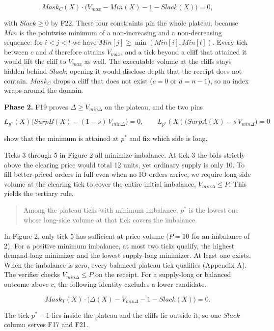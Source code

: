 \[Mask_C(X) \cdot \big(V_{max} - Min(X) - 1 - Slack(X)\big) = 0, \tag{F17}\]

with \(Slack \ge 0\) by F22. These four constraints pin the whole plateau, because \(Min\) is the pointwise minimum of a non-increasing and a non-decreasing sequence: for \(i < j < l\) we have \(Min[j] \ge \min(Min[i], Min[l])\). Every tick between \(c\) and \(d\) therefore attains \(V_{max}\), and a tick beyond a cliff that attained it would lift the cliff to \(V_{max}\) as well. The executable volume at the cliffs stays hidden behind \(Slack\); opening it would disclose depth that the receipt does not contain. \(Mask_C\) drops a cliff that does not exist (\(c = 0\) or \(d = n-1\)), so no index wraps around the domain.

\textbf{Phase 2.} F19 proves \(\Delta \ge V_{min\Delta}\) on the plateau, and the two pins

\[L_{p^*}(X)\big(SurpB(X) - (1-s)\,V_{min\Delta}\big) = 0, \qquad L_{p^*}(X)\big(SurpA(X) - s\,V_{min\Delta}\big) = 0 \tag{F20}\]

show that the minimum is attained at \(p^*\) and fix which side is long.

Ticks 3 through 5 in Figure 2 all minimize imbalance. At tick 3 the bids strictly above the clearing price would total 12 units, yet ordinary supply is only 10. To fill better-priced orders in full even when no IO orders arrive, we require long-side volume at the clearing tick to cover the entire initial imbalance, \(V_{min\Delta}\le P\). This yields the tertiary rule.

\begin{quote}
Among the plateau ticks with minimum imbalance, \(p^*\) is the lowest one whose long-side volume at that tick covers the imbalance.
\end{quote}

In Figure 2, only tick 5 has sufficient at-price volume (\(P=10\) for an imbalance of 2). For a positive minimum imbalance, at most two ticks qualify, the highest demand-long minimizer and the lowest supply-long minimizer. At least one exists. When the imbalance is zero, every balanced plateau tick qualifies (Appendix A). The verifier checks \(V_{min\Delta}\le P\) on the receipt. For a supply-long or balanced outcome above \(c\), the following identity excludes a lower candidate.

\[Mask_T(X) \cdot \big(\Delta(X) - V_{min\Delta} - 1 - Slack(X)\big) = 0. \tag{F21}\]

The tick \(p^* - 1\) lies inside the plateau and the cliffs lie outside it, so one \(Slack\) column serves F17 and F21.


